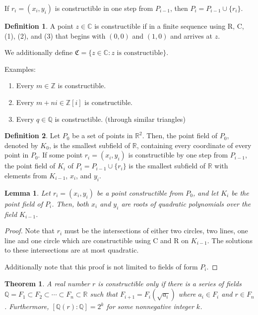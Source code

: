 \documentclass{article}
\theoremstyle{definition}
\newtheorem{definition}{Definition}
\theoremstyle{plain}
\newtheorem{theorem}{Theorem}
\theoremstyle{corollary}
\theoremstyle{lemma}
\newtheorem{lemma}{Lemma}
\begin{document}
If $r_i=(x_i,y_i)$ is constructible in one step from $P_{i-1}$, then $P_i=P_{i-1}\cup\{r_i\}$.

\begin{definition}
    A point $z\in \mathbb{C}$ is constructible if in a finite sequence using R, C, (1), (2), and (3) that begins with $(0,0)$ and $(1,0)$ and arrives at $z$.

    We additionally define $\mathfrak{C}=\{z\in\mathbb{C}:z\text{ is constructible}\}$.
\end{definition}

Examples:
\begin{enumerate}
    \item Every $m\in\mathbb{Z}$ is constructible.
    \item Every $m+ni\in\mathbb{Z}[i]$ is constructible.
    \item Every $q\in\mathbb{Q}$ is constructible. (through similar triangles)
\end{enumerate}

\begin{definition}
    Let $P_0$ be a set of points in $\mathbb{R}^2$. Then, the point field of $P_0$, denoted by $K_0$, is the smallest subfield of $\mathbb{R}$, containing every coordinate of every point in $P_0$. If some point $r_i=(x_i,y_i)$ is constructible by one step from $P_{i-1}$, the point field of $K_i$ of $P_i=P_{i-1}\cup\{r_i\}$ is the smallest subfield of $\mathbb{R}$ with elements from $K_{i-1}$, $x_i$, and $y_i$.
\end{definition}

\begin{lemma}
    Let $r_i=(x_i,y_i)$ be a point constructible from $P_0$, and let $K_i$ be the point field of $P_i$. Then, both $x_i$ and $y_i$ are roots of quadratic polynomials over the field $K_{i-1}$.
\end{lemma}

\begin{proof}
    Note that $r_i$ must be the intersections of either two circles, two lines, one line and one circle which are constructible using C and R on $K_{i-1}$. The solutions to these intersections are at most quadratic.

    Additionally note that this proof is not limited to fields of form $P_i$.
\end{proof}

\begin{theorem}
    A real number $r$ is constructible only if there is a series of fields $\mathbb{Q}=F_1\subset F_2\subset\cdots\subset F_n\subset\mathbb{R}$ such that $F_{i+1}=F_i(\sqrt{a_i})$ where $a_i\in F_i$ and $r\in F_n$. Furthermore, $[\mathbb Q(r):\mathbb{Q}]=2^k$ for some nonnegative integer $k$.
\end{theorem}
\end{document}
